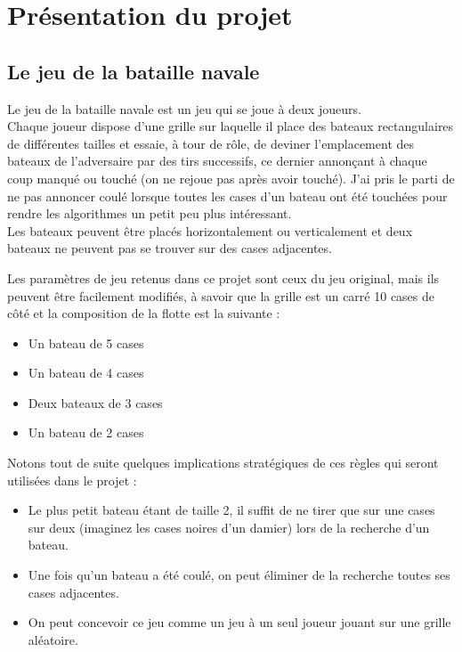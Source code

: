 \chapter{Présentation du projet}

\section{Le jeu de la bataille navale}
Le jeu de la bataille navale est un jeu qui se joue à deux joueurs.\\
Chaque joueur dispose d'une grille sur laquelle il place des bateaux rectangulaires de différentes tailles et essaie, à tour de rôle, de deviner l'emplacement des bateaux de l'adversaire par des tirs successifs, ce dernier annonçant à chaque coup \og manqué \fg{} ou \og touché \fg{} (on ne rejoue pas après avoir touché). J'ai pris le parti de ne pas annoncer \og coulé \fg{} lorsque toutes les cases d'un bateau ont été touchées pour rendre les algorithmes un petit peu plus intéressant.\\
Les bateaux peuvent être placés horizontalement ou verticalement et deux bateaux ne peuvent pas se trouver sur des cases adjacentes.

Les paramètres de jeu retenus dans ce projet sont ceux du jeu original, mais ils peuvent être facilement modifiés, à savoir que la grille est un carré 10 cases de côté et la composition de la flotte est la suivante :
\begin{itemize}
\item Un bateau de 5 cases
\item Un bateau de 4 cases
\item Deux bateaux de 3 cases
\item Un bateau de 2 cases
\end{itemize}

\medskip

Notons tout de suite quelques implications stratégiques de ces règles qui seront utilisées dans le projet :
\begin{itemize}
\item Le plus petit bateau étant de taille 2, il suffit de ne tirer que sur une cases sur deux (imaginez les cases noires d'un damier) lors de la recherche d'un bateau.
\item Une fois qu'un bateau a été coulé, on peut éliminer de la recherche toutes ses cases adjacentes.
\item On peut concevoir ce jeu comme un jeu à un seul joueur jouant sur une grille aléatoire.
\end{itemize}

